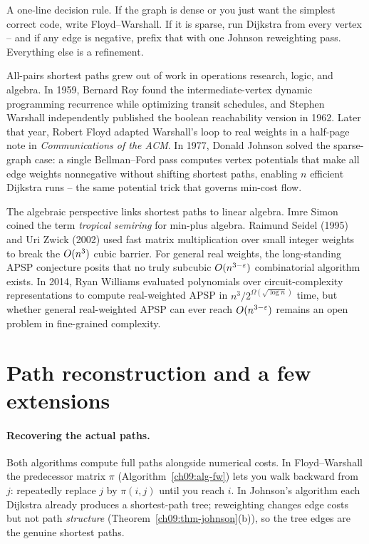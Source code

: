 \begin{intuitionbox}
A one-line decision rule. If the graph is dense or you just want the simplest correct code, write
Floyd--Warshall. If it is sparse, run Dijkstra from every vertex -- and if any edge is negative, prefix
that with one Johnson reweighting pass. Everything else is a refinement.
\end{intuitionbox}

\begin{historybox}
All-pairs shortest paths grew out of work in operations research, logic, and algebra.
In 1959, Bernard Roy found the intermediate-vertex dynamic programming recurrence while
optimizing transit schedules, and Stephen Warshall independently published the boolean reachability
version in 1962. Later that year, Robert Floyd adapted Warshall's loop to real weights in a
half-page note in \emph{Communications of the ACM}. In 1977, Donald Johnson solved the sparse-graph
case: a single Bellman--Ford pass computes vertex potentials that make all edge weights nonnegative
without shifting shortest paths, enabling $n$ efficient Dijkstra runs -- the same potential trick
that governs min-cost flow.

The algebraic perspective links shortest paths to linear algebra. Imre Simon coined the term
\emph{tropical semiring} for min-plus algebra. Raimund Seidel (1995) and Uri Zwick (2002) used
fast matrix multiplication over small integer weights to break the $O(n^3)$ cubic barrier.
For general real weights, the long-standing APSP conjecture posits that no truly subcubic
$O(n^{3-\varepsilon})$ combinatorial algorithm exists. In 2014, Ryan Williams evaluated polynomials
over circuit-complexity representations to compute real-weighted APSP in $n^3/2^{\Omega(\sqrt{\log n})}$
time, but whether general real-weighted APSP can ever reach $O(n^{3-\varepsilon})$ remains an open
problem in fine-grained complexity.
\end{historybox}

\section{Path reconstruction and a few extensions}
\label{ch09:extensions}

\paragraph{Recovering the actual paths.} Both algorithms compute full paths alongside numerical costs. In
Floyd--Warshall the predecessor matrix $\pi$ (Algorithm~\ref{ch09:alg-fw}) lets you walk backward from
$j$: repeatedly replace $j$ by $\pi(i,j)$ until you reach $i$. In Johnson's algorithm each Dijkstra
already produces a shortest-path tree; reweighting changes edge costs but not path \emph{structure}
(Theorem~\ref{ch09:thm-johnson}(b)), so the tree edges are the genuine shortest paths.


